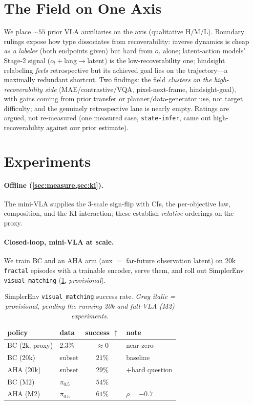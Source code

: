 \documentclass{article}
\newcommand{\prov}[1]{\textcolor{gray!85}{\textit{#1}}} %
\newcommand{\aha}{\textsc{AHA}}
\begin{document}
\section{The Field on One Axis}\label{sec:survey}
We place ${\sim}55$ prior VLA auxiliaries on the axis (qualitative H/M/L). Boundary rulings expose how type
dissociates from recoverability: inverse dynamics is cheap \emph{as a labeler} (both endpoints given) but hard from
$o_t$ alone; latent-action models' Stage-2 signal ($o_t{+}$lang$\to$latent) is the low-recoverability one;
hindsight relabeling \emph{feels} retrospective but its achieved goal lies on the trajectory---a maximally
redundant shortcut. Two findings: the field \emph{clusters on the high-recoverability side} (MAE/contrastive/VQA,
pixel-next-frame, hindsight-goal), with gains coming from prior transfer or planner/data-generator use, not target
difficulty; and the genuinely retrospective lane is nearly empty. Ratings are argued, not re-measured (one measured
case, \texttt{state-infer}, came out high-recoverability against our prior estimate).

\section{Experiments}\label{sec:exp}
\paragraph{Offline (\cref{sec:measure,sec:ki}).} The mini-VLA supplies the 3-scale sign-flip with CIs, the
per-objective law, composition, and the KI interaction; these establish \emph{relative} orderings on the proxy.

\paragraph{Closed-loop, mini-VLA at scale.} We train BC and an \aha{} arm (aux $=$ far-future observation latent)
on 20k \texttt{fractal} episodes with a trainable encoder, serve them, and roll out SimplerEnv
\texttt{visual\_matching} (\cref{tab:closed}, \prov{provisional}).

\begin{table}[t]\centering\small
\caption{SimplerEnv \texttt{visual\_matching} success rate. \prov{Gray italic = provisional, pending the running
20k and full-VLA (M2) experiments.}}
\label{tab:closed}
\begin{tabular}{@{}llcl@{}}
\toprule
policy & data & success $\uparrow$ & note \\
\midrule
BC (2k, proxy)   & 2.3\%       & \prov{$\approx 0$} & near-zero \\
BC (20k)         & subset      & \prov{$21\%$}      & baseline \\
\aha{} (20k)     & subset      & \prov{$29\%$}      & $+$hard question \\
\midrule
BC (M2)          & $\pi_{0.5}$ & \prov{$54\%$}      & \\
\aha{} (M2)      & $\pi_{0.5}$ & \prov{$61\%$}      & $\rho$\prov{$=-0.7$} \\
\bottomrule
\end{tabular}
\end{table}
\end{document}

